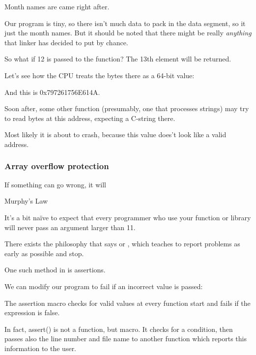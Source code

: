Month names are came right after.

Our program is tiny, so there isn't much data to pack in the data segment, 
so it just the month names.
But it should be noted that there might be really \emph{anything} that linker has decided to put by chance.

So what if 12 is passed to the function?
The 13th element will be returned.

Let's see how the CPU treats the bytes there as a 64-bit value:



And this is 0x797261756E614A.

Soon after, some other function (presumably, one that processes strings) may try to read bytes at 
this address, expecting a C-string there.

Most likely it is about to crash, because this value does't look like a valid address.

\subsubsection{Array overflow protection}

\epigraph{If something can go wrong, it will}{Murphy's Law}

It's a bit naïve to expect that every programmer who use your function or library will never pass
an argument larger than 11.

There exists the philosophy that says  or , 
which teaches to report problems as early as possible and stop.

One such method in \CCpp is assertions.

We can modify our program to fail if an incorrect value is passed:



The assertion macro checks for valid values at every function start and fails if the expression is false.



In fact, assert() is not a function, but macro. It checks for a condition, then passes also the line number and file
name to another function which reports this information to the user.

